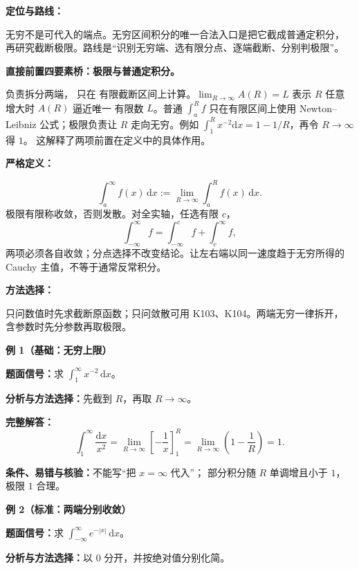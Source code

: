 \par

\begin{knowledgeBox}
\textbf{定位与路线：}

无穷不是可代入的端点。无穷区间积分的唯一合法入口是把它截成普通定积分，
再研究截断极限。路线是“识别无穷端、选有限分点、逐端截断、分别判极限”。

\textbf{直接前置四要素桥：极限与普通定积分。}

负责拆分两端，
只在
有限截断区间上计算。\(\lim_{R\to\infty}A(R)=L\) 表示
\(R\) 任意增大时 \(A(R)\) 逼近唯一
有限数 \(L\)。普通 \(\int_a^Rf\) 只在有限区间上使用 Newton--Leibniz
公式；极限负责让 \(R\) 走向无穷。例如
\(\int_1^R x^{-2}\mathrm dx=1-1/R\)，再令 \(R\to\infty\) 得 \(1\)。
这解释了两项前置在定义中的具体作用。

\textbf{严格定义：}

\[
\boxed{\int_a^\infty f(x)\,\mathrm dx
:=\lim_{R\to\infty}\int_a^R f(x)\,\mathrm dx.}
\]
极限有限称收敛，否则发散。对全实轴，任选有限 \(c\)，
\[
\int_{-\infty}^{\infty}f
=\int_{-\infty}^{c}f+\int_c^\infty f,
\]
两项必须各自收敛；分点选择不改变结论。让左右端以同一速度趋于无穷所得的
Cauchy 主值，不等于通常反常积分。

\textbf{方法选择：}

只问数值时先求截断原函数；只问敛散可用 K103、K104。两端无穷一律拆开，
含参数时先分参数再取极限。

\textbf{例 1（基础：无穷上限）}

\textbf{题面信号：}求 \(\int_1^\infty x^{-2}\,\mathrm dx\)。

\textbf{分析与方法选择：}先截到 \(R\)，再取 \(R\to\infty\)。

\textbf{完整解答：}
\[
\int_1^\infty\frac{\mathrm dx}{x^2}
=\lim_{R\to\infty}\left[-\frac1x\right]_1^R
=\lim_{R\to\infty}\left(1-\frac1R\right)=1.
\]

\textbf{条件、易错与核验：}不能写“把 \(x=\infty\) 代入”；
部分积分随 \(R\) 单调增且小于 \(1\)，极限 \(1\) 合理。

\textbf{例 2（标准：两端分别收敛）}

\textbf{题面信号：}求 \(\int_{-\infty}^{\infty}e^{-|x|}\,\mathrm dx\)。

\textbf{分析与方法选择：}以 \(0\) 分开，并按绝对值分别化简。


\end{knowledgeBox}
